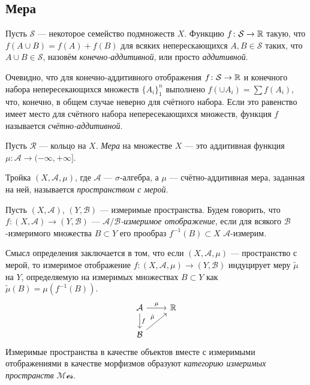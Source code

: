 \subsection{Мера}
\begin{defin}
	Пусть $\mathcal{S}$ --- некоторое семейство подмножеств $X$. Функцию $f\colon\mathcal{S}\to\mathbb {R}$ такую, что $f(A\cup B)=f(A)+f(B)$ для всяких неперескающихся $A,B\in\mathcal{S}$ таких, что $A\cup B\in\mathcal{S}$, назовём \textit{конечно-аддитивной}, или просто \textit{аддитивной}.
\end{defin}
Очевидно, что для конечно-аддитивного отображения $f\colon\mathcal{S}\to\mathbb {R}$ и конечного набора непересекающихся множеств $\{A_i\}_1^n$ выполнено $f\left(\displaystyle\cup A_i\right)=\sum f(A_i)$, что, конечно, в общем случае неверно для счётного набора. Если это равенство имеет место для счётного набора непересекающихся множеств, функция $f$ называется \textit{счётно-аддитивной}.
\begin{defin}
	Пусть $\mathcal{R}$ --- кольцо на $X$. \textit{Мера} на множестве $X$ --- это аддитивная функция $\mu\colon\mathcal{A}\to(-\infty,+\infty]$.
\end{defin}
\begin{defin}
	Тройка $(X,\mathcal{A},\mu)$, где $\mathcal{A}$ --- $\sigma$-алгебра, а $\mu$ --- счётно-аддитивная мера, заданная на ней, называется \textit{пространством с мерой}.
\end{defin}
\begin{defin}
	Пусть $(X,\mathcal{A})$, $(Y,\mathcal{B})$ --- измеримые пространства. Будем говорить, что $f\colon(X,\mathcal{A})\to(Y,\mathcal{B})$ --- \textit{$\mathcal{A}/\mathcal{B}$-измеримое отображение}, если для всякого $\mathcal{B}$-измеримого множества $B\subset Y$ его прообраз $f^{-1}(B)\subset X$ $\mathcal{A}$-измерим. 
\end{defin}
Смысл определения заключается в том, что если $(X,\mathcal{A},\mu)$ --- пространство с мерой, то измеримое отображение $f\colon(X,\mathcal{A},\mu)\to(Y,\mathcal{B})$ индуцирует меру $\tilde{\mu}$ на $Y$, определяемую на измеримых множествах $B\subset Y$ как $\tilde{\mu}(B)=\mu(f^{-1}(B))$.
	\begin{equation*}
		\begin{tikzcd}
			\mathcal{A} \arrow{r}{\mu} \arrow{d}{f} & \RR \\                       
			\mathcal{B} \arrow{ru}{\tilde{\mu}} & 
		\end{tikzcd}
	\end{equation*}
Измеримые пространства в качестве объектов вместе с измеримыми отображениями в качестве морфизмов образуют \textit{категорию измеримых пространств} $\mathcal{Mes}$.

